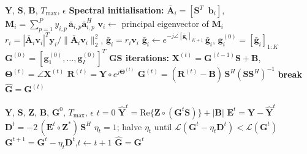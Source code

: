 \documentclass[11pt,a4paper]{article}
\begin{document}
\begin{algorithm}[H]
\caption{Biased Gerchberg--Saxton (GS), 1D array~\cite{cui2025towards,netrapalli2015}}
\label{alg:gs}
\begin{algorithmic}[1]
\Require $\mathbf Y$, $\mathbf S$, $\mathbf B$, $T_{\max}$, $\epsilon$
\State \textbf{Spectral initialisation:}
  \State $\bar{\mathbf A}_i=[\mathbf S^T\;\;\mathbf b_i]$,\quad
         $\mathbf M_i=\sum_{p=1}^{P}y_{i,p}\,\bar{\mathbf a}_{i,p}\bar{\mathbf a}_{i,p}^H$
  \State $\mathbf v_i\gets$ principal eigenvector of $\mathbf M_i$
  \State $r_i=|\bar{\mathbf A}_i\mathbf v_i|^T\mathbf y_i/\|\bar{\mathbf A}_i\mathbf v_i\|_2^2$,\quad
         $\bar{\mathbf g}_i=r_i\mathbf v_i$
  \State $\bar{\mathbf g}_i\gets e^{-j\angle[\bar{\mathbf g}_i]_{K+1}}\,\bar{\mathbf g}_i$,\quad
         $\mathbf g_i^{(0)}=[\bar{\mathbf g}_i]_{1:K}$
\EndFor
\State $\mathbf G^{(0)}=[\mathbf g_1^{(0)},\dots,\mathbf g_I^{(0)}]^T$
\State \textbf{GS iterations:}
  \State $\mathbf X^{(t)}=\mathbf G^{(t-1)}\mathbf S+\mathbf B$,\quad
         $\bm\Theta^{(t)}=\angle\mathbf X^{(t)}$
  \State $\mathbf R^{(t)}=\mathbf Y\circ e^{j\bm\Theta^{(t)}}$
  \State $\mathbf G^{(t)}=(\mathbf R^{(t)}-\mathbf B)\,\mathbf S^H(\mathbf S\mathbf S^H)^{-1}$
   \textbf{break}
  \EndIf
\EndFor
\State \Return $\hat{\mathbf G}=\mathbf G^{(t)}$
\end{algorithmic}
\end{algorithm}

\begin{algorithm}[H]
\caption{Gradient descent (GD), 1D array~\cite{xu2025channel}}
\label{alg:gd}
\begin{algorithmic}[1]
\Require $\mathbf Y$, $\mathbf S$, $\mathbf Z$, $\mathbf B$, $\mathbf G^0$, $T_{\max}$, $\epsilon$
\State $t=0$
\Repeat
  \State $\hat{\mathbf Y}^t=\mathrm{Re}\{\mathbf Z\circ(\mathbf G^t\mathbf S)\}+|\mathbf B|$
  \State $\mathbf E^t=\mathbf Y-\hat{\mathbf Y}^t$
  \State $\mathbf D^t=-2\,(\mathbf E^t\circ\mathbf Z^*)\,\mathbf S^H$
  \State $\eta_t=1$; halve $\eta_t$ until $\mathcal L(\mathbf G^t-\eta_t\mathbf D^t)<\mathcal L(\mathbf G^t)$
  \State $\mathbf G^{t+1}=\mathbf G^t-\eta_t\mathbf D^t$,\quad $t\gets t+1$
\State \Return $\hat{\mathbf G}=\mathbf G^t$
\end{algorithmic}
\end{algorithm}
\end{document}
